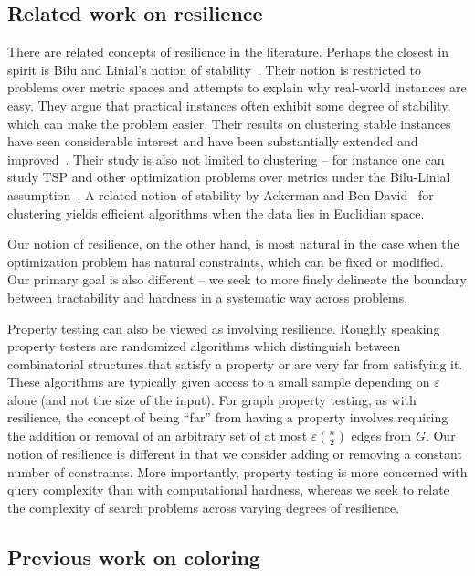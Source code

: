\documentclass{llncs}
\begin{document}
\subsection{Related work on resilience}

There are related concepts of resilience in the literature. Perhaps the closest
in spirit is Bilu and Linial's notion of stability~\cite{BL12}.  Their notion
is restricted to problems over metric spaces and attempts to explain why
real-world instances are easy.  They argue that practical instances often
exhibit some degree of stability, which can make the problem easier.  Their
results on clustering stable instances have seen considerable interest and have
been substantially extended and improved~\cite{ABS10,BL12,Rey11}.  Their study
is also not limited to clustering -- for instance one can study TSP and other
optimization problems over metrics under the Bilu-Linial
assumption~\cite{MSSW11}.  
A related notion of stability by 
Ackerman and Ben-David~\cite{AckermanB09} for clustering 
yields efficient algorithms when the data lies in Euclidian space.

Our notion of resilience, on the other hand, is most natural in the case when
the optimization problem has natural constraints, which can be fixed or
modified.  Our primary goal is also different -- we seek to more finely
delineate the boundary between tractability and hardness in a systematic way
across problems.

Property testing can also be viewed as involving resilience. Roughly speaking
property testers are randomized algorithms which distinguish between
combinatorial structures that satisfy a property or are very far from satisfying
it. These algorithms are typically given access to a small sample depending on
$\varepsilon$ alone (and not the size of the input). For graph property testing,
as with resilience, the concept of being ``far'' from having a property involves
requiring the addition or removal of an arbitrary set of at most $\varepsilon
\binom{n}{2}$ edges from $G$. Our notion of resilience is different in that we
consider adding or removing a constant number of constraints. More importantly,
property testing is more concerned with query complexity than with
computational hardness, whereas we seek to relate the
complexity of search problems across varying degrees of resilience. 

\subsection{Previous work on coloring}
\end{document}
